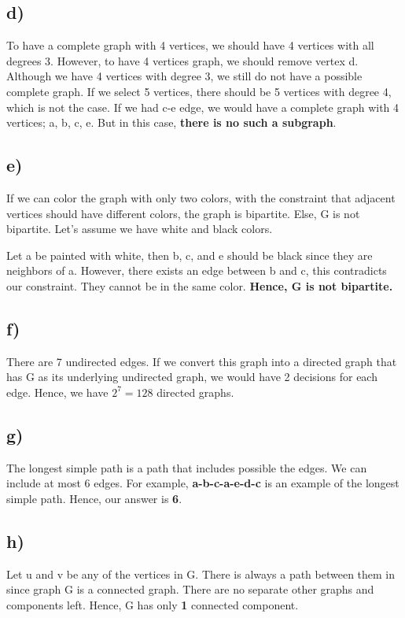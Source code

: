 \documentclass[12pt]{article}
\begin{document}
\subsection*{d) }
To have a complete graph with 4 vertices, we should have 4 vertices with all degrees 3. However, to have 4 vertices graph, we should remove vertex d. Although we have 4 vertices with degree 3, we still do not have a possible complete graph. If we select 5 vertices, there should be 5 vertices with degree 4, which is not the case. If we had c-e edge, we would have a complete graph with 4 vertices; a, b, c, e. But in this case, \textbf{there is no such a subgraph}.

\subsection*{e) }
If we can color the graph with only two colors, with the constraint that adjacent vertices should have different colors, the graph is bipartite. Else, G is not bipartite. Let's assume we have white and black colors.

Let a be painted with white, then b, c, and e should be black since they are neighbors of a. However, there exists an edge between b and c, this contradicts our constraint. They cannot be in the same color. \textbf{Hence, G is not bipartite.}\\ 

\subsection*{f) }

There are 7 undirected edges. If we convert this graph into a directed graph that has G as its underlying undirected graph, we would have 2 decisions for each edge. Hence, we have \textbf{$2^7 = 128$} directed graphs.

\subsection*{g) }
The longest simple path is a path that includes possible the edges. We can include at most 6 edges. For example, \textbf{a-b-c-a-e-d-c} is an example of the longest simple path. Hence, our answer is \textbf{6}.

\subsection*{h) }
Let u and v be any of the vertices in G. There is always a path between them in since graph G is a connected graph. There are no separate other graphs and components left. Hence, G has only \textbf{1} connected component. 
\end{document}
